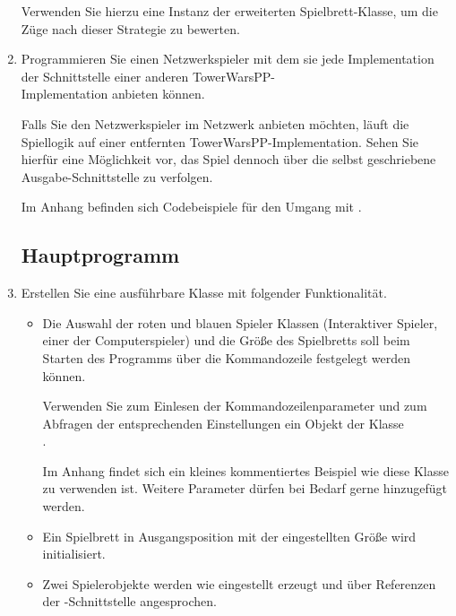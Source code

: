\begin{enumerate}
Verwenden Sie hierzu eine Instanz der erweiterten Spielbrett-Klasse, um die Züge nach dieser Strategie zu bewerten.

\item Programmieren Sie einen Netzwerkspieler mit dem sie jede Implementation der Schnittstelle  einer anderen TowerWarsPP- \\Implementation anbieten können.

Falls Sie den Netzwerkspieler im Netzwerk anbieten möchten, läuft die Spiellogik auf einer entfernten TowerWarsPP-Implementation. Sehen Sie hierfür eine Möglichkeit vor, das Spiel dennoch über die selbst geschriebene Ausgabe-Schnittstelle zu verfolgen.

Im Anhang befinden sich Codebeispiele für den Umgang mit .

\subsection*{Hauptprogramm}
\item Erstellen Sie eine ausführbare Klasse mit folgender Funktionalität.
\begin{itemize}
\item Die Auswahl der roten und blauen Spieler Klassen (Interaktiver Spieler, einer der Computerspieler) und die Größe des Spielbretts soll beim Starten des Programms über die Kommandozeile festgelegt werden können.

Verwenden Sie zum Einlesen der Kommandozeilenparameter und zum Abfragen der entsprechenden Einstellungen ein Objekt der Klasse \\
.

Im Anhang findet sich ein kleines kommentiertes Beispiel wie diese Klasse zu verwenden ist. Weitere Parameter dürfen bei Bedarf gerne hinzugefügt werden.
\item Ein Spielbrett in Ausgangsposition mit der eingestellten Größe wird initialisiert.
\item Zwei Spielerobjekte werden wie eingestellt erzeugt und über Referenzen der -Schnittstelle angesprochen. 


\end{itemize}
\end{enumerate}

